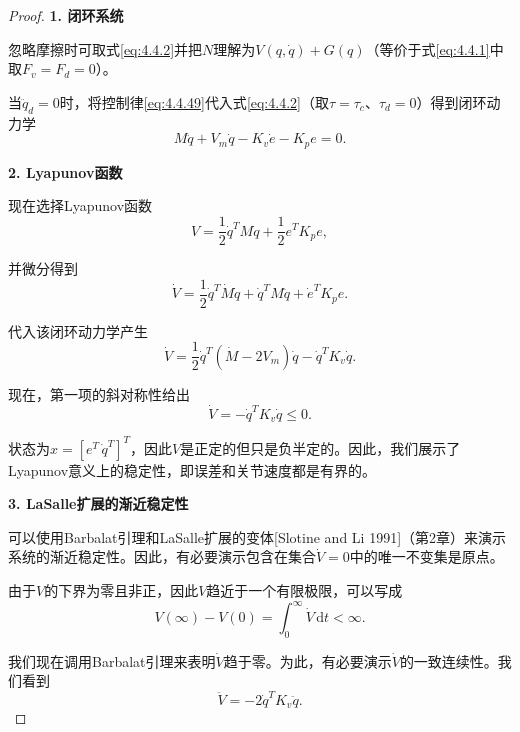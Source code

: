 \documentclass[UTF8]{ctexart}
\theoremstyle{definition}
\newcommand{\dd}{\mathrm{d}}
\begin{document}
\begin{proof}
\textbf{1. 闭环系统}

忽略摩擦时可取式\eqref{eq:4.4.2}并把$N$理解为$V(q,\dot{q})+G(q)$（等价于式\eqref{eq:4.4.1}中取$F_v=F_d=0$）。

当$\ddot{q}_d = 0$时，将控制律\eqref{eq:4.4.49}代入式\eqref{eq:4.4.2}（取$\tau=\tau_c$、$\tau_d=0$）得到闭环动力学
\begin{equation*}
    M\ddot{q} + V_m\dot{q} - K_v\dot{e} - K_pe = 0.
\end{equation*}

\textbf{2. Lyapunov函数}

现在选择Lyapunov函数
\begin{equation*}
    V = \frac{1}{2}\dot{q}^TM\dot{q} + \frac{1}{2}e^TK_pe,
\end{equation*}

并微分得到
\begin{equation*}
    \dot{V} = \frac{1}{2}\dot{q}^T\dot{M}\dot{q} + \dot{q}^TM\ddot{q} + \dot{e}^TK_pe.
\end{equation*}

代入该闭环动力学产生
\begin{equation*}
    \dot{V} = \frac{1}{2}\dot{q}^T(\dot{M} - 2V_m)\dot{q} - \dot{q}^TK_v\dot{q}.
\end{equation*}

现在，第一项的斜对称性给出
\begin{equation*}
    \dot{V} = -\dot{q}^TK_v\dot{q} \leq 0.
\end{equation*}

状态为$x = [e^T \, \dot{q}^T]^T$，因此$V$是正定的但只是负半定的。因此，我们展示了Lyapunov意义上的稳定性，即误差和关节速度都是有界的。

\textbf{3. LaSalle扩展的渐近稳定性}

可以使用Barbalat引理和LaSalle扩展的变体[Slotine and Li 1991]（第2章）来演示系统的渐近稳定性。因此，有必要演示包含在集合$\dot{V} = 0$中的唯一不变集是原点。

由于$V$的下界为零且非正，因此$V$趋近于一个有限极限，可以写成
\begin{equation*}
    V(\infty) - V(0) = \int_0^\infty \dot{V}\,\dd t < \infty.
\end{equation*}

我们现在调用Barbalat引理来表明$\dot{V}$趋于零。为此，有必要演示$\dot{V}$的一致连续性。我们看到
\begin{equation*}
    \ddot{V} = -2\dot{q}^TK_v\ddot{q}.
\end{equation*}


\end{proof}
\end{document}
